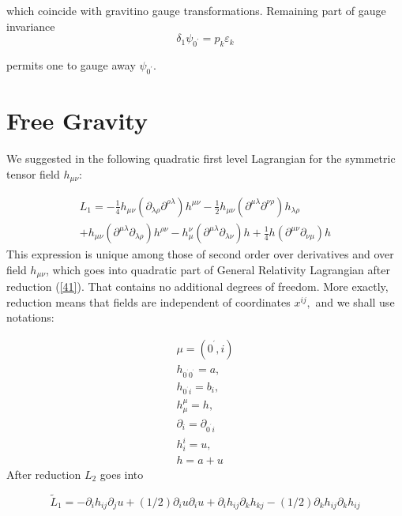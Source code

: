 \documentclass[a4paper,12pt]{article}
\begin{document}
which coincide with gravitino gauge transformations. Remaining
part of gauge invariance
\begin{equation}
\delta _{1}\psi _{0^{\prime }}=p_{k}\varepsilon _{k}
\end{equation}

permits one to gauge away $\psi _{0^{\prime }}.$



\section{Free Gravity}

    We suggested in \cite{Man1} the following quadratic first level Lagrangian
for the symmetric tensor field $h_{\mu \nu }$:

\begin{equation}
\begin{array}{l}
L_{1}=-\frac{1}{4}h_{\mu \nu }(\partial _{\lambda \rho }\partial
^{\rho \lambda })h^{\mu \nu } -\frac{1}{2}h_{\mu \nu }(\partial
^{\mu \lambda }\partial ^{\nu \rho })h_{\lambda \rho }\\
+h_{\mu
\nu }(\partial ^{\mu \lambda }\partial _{\lambda \rho })h^{\rho
\nu }-h_{\mu }^{\nu }(\partial ^{\mu \lambda }\partial _{\lambda
\nu })h+ \frac{1}{4}h(\partial ^{\mu \nu }\partial _{\nu \mu })h
\label{L2}
\end{array}
\end{equation}
This expression is unique among those of second order over
derivatives and over field $h_{\mu \nu }$, which goes into
quadratic part of General Relativity Lagrangian after reduction
(\ref{41}). That contains no additional degrees of freedom. More
exactly, reduction means that fields are independent of
coordinates $x^{ij},$ and we shall use notations:

\begin{eqnarray}
\mu =(0^{^{\prime }},i) \\
h_{0^{^{\prime }}0^{^{\prime }}}=a,\\
h_{0^{^{\prime }}i}=b_{i},\\
 h_{\mu }^{\mu} =h, \\
\partial
_{i}=\partial _{0^{^{\prime }}i} \\
h_{i}^{i}=u, \\
h=a+u
\end{eqnarray}
After reduction $L_{2}$ goes into

\begin{equation}
\widetilde{L}_{1}=-\partial _{i}h_{ij}\partial _{j}u+(1/2)\partial
_{i}u\partial _{i}u+\partial _{i}h_{ij}\partial
_{k}h_{kj}-(1/2)\partial _{k}h_{ij}\partial _{k}h_{ij}  \label{l2}
\end{equation}
\end{document}
